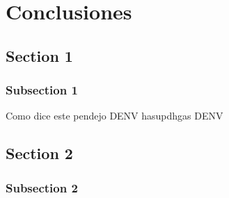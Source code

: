 \chapter{Conclusiones}
\label{ch5}

\section{Section 1}
    \subsection{Subsection 1}
 Como dice este pendejo \cite{Barzon2016,pablin,LeBlanc2012} \ac{DENV} hasupdhgas \ac{DENV}
\section{Section 2}
    \subsection{Subsection 2}